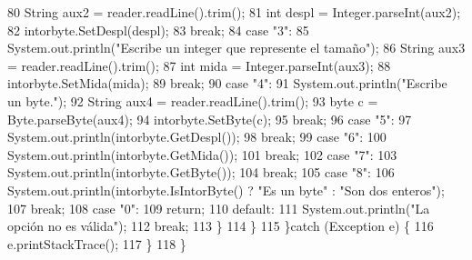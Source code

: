 \begin{DoxyCode}
80                     String aux2 = reader.readLine().trim();
81                     \textcolor{keywordtype}{int} despl = Integer.parseInt(aux2);
82                     intorbyte.SetDespl(despl);
83                 \textcolor{keywordflow}{break};
84                 \textcolor{keywordflow}{case} \textcolor{stringliteral}{"3"}:
85                     System.out.println(\textcolor{stringliteral}{"Escribe un integer que represente el tamaño"});
86                     String aux3 = reader.readLine().trim();
87                     \textcolor{keywordtype}{int} mida = Integer.parseInt(aux3);
88                     intorbyte.SetMida(mida);
89                 \textcolor{keywordflow}{break};
90                 \textcolor{keywordflow}{case} \textcolor{stringliteral}{"4"}:
91                     System.out.println(\textcolor{stringliteral}{"Escribe un byte."});
92                     String aux4 = reader.readLine().trim();
93                     byte c = Byte.parseByte(aux4);
94                     intorbyte.SetByte(c);
95                 \textcolor{keywordflow}{break};
96                 \textcolor{keywordflow}{case} \textcolor{stringliteral}{"5"}:
97                     System.out.println(intorbyte.GetDespl());
98                 \textcolor{keywordflow}{break};
99                 \textcolor{keywordflow}{case} \textcolor{stringliteral}{"6"}:
100                     System.out.println(intorbyte.GetMida());
101                 \textcolor{keywordflow}{break};
102                 \textcolor{keywordflow}{case} \textcolor{stringliteral}{"7"}:
103                     System.out.println(intorbyte.GetByte());
104                 \textcolor{keywordflow}{break};
105                 \textcolor{keywordflow}{case} \textcolor{stringliteral}{"8"}:
106                     System.out.println(intorbyte.IsIntorByte() ? \textcolor{stringliteral}{"Es un byte"} : \textcolor{stringliteral}{"Son dos enteros"});
107                 \textcolor{keywordflow}{break};
108                 \textcolor{keywordflow}{case} \textcolor{stringliteral}{"0"}:
109                     \textcolor{keywordflow}{return};
110                 \textcolor{keywordflow}{default}:
111                     System.out.println(\textcolor{stringliteral}{"La opción no es válida"});
112                 \textcolor{keywordflow}{break};
113             \}
114         \}
115     \}\textcolor{keywordflow}{catch} (Exception e) \{
116         e.printStackTrace();
117     \}
118     \}
\end{DoxyCode}
\mbox{\label{classdomini_1_1utils_1_1Driver____IntorByte_a4b647dae1760fc058de9a7311595d8dd}} 
